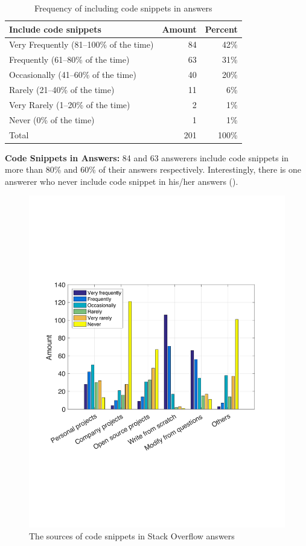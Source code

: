 \documentclass[10pt,journal,compsoc]{IEEEtran}
\begin{document}
\begin{table}
	\centering
	\caption{Frequency of including code snippets in answers}
	\label{tab:survey_code_snippet_frequency}
	\begin{tabular}{lrr}
		\toprule
		Include code snippets & Amount & Percent \\
		\midrule
		Very Frequently (81--100\% of the time)	& 84 & 42\% \\
		Frequently (61--80\% of the time) &	63 & 31\% \\
		Occasionally (41--60\% of the time) & 40 & 20\% \\
		Rarely (21--40\% of the time) & 11 & 6\% \\
		Very Rarely (1--20\% of the time) & 2 & 1\% \\
		Never (0\% of the time) & 1 & 1\% \\
		\midrule
		Total & 201 & 100\% \\
		\bottomrule
	\end{tabular}
\end{table}

\textbf{Code Snippets in Answers:}
84 and 63 answerers include code snippets in more than 80\% and 60\% of
their answers respectively. Interestingly, there is one answerer who never
include code snippet in his/her answers ().

\begin{figure}
	\centering
	\includegraphics[width=0.9\linewidth]{survey_snippet_source}
	\caption{The sources of code snippets in Stack Overflow answers}
	\label{fig:survey_snippet_source}
\end{figure}
\end{document}
